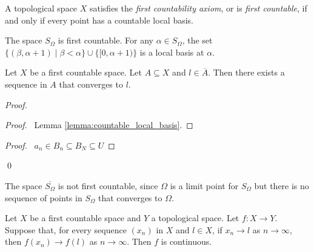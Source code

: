 \begin{definition}
    A topological space $X$ satisfies the \emph{first countability axiom}, or is \emph{first countable}, if and only if every point has a countable local basis.
\end{definition}

\begin{example}
    The space $S_\Omega$ is first countable. For any $\alpha \in S_\Omega$,
    the set $\{ (\beta, \alpha + 1) \mid \beta < \alpha \} \cup \{ [0, \alpha + 1) \}$
    is a local basis at $\alpha$.
\end{example}

\begin{lemma}
    Let $X$ be a first countable space. Let $A \subseteq X$ and $l \in \overline{A}$.
    Then there exists a sequence in $A$ that converges to $l$.
\end{lemma}

\begin{proof}
    \pf
    \begin{proof}
        \pf\ Lemma \ref{lemma:countable_local_basis}.
    \end{proof}
    \begin{proof}
        \pf\ $a_n \in B_n \subseteq B_N \subseteq U$
    \end{proof}
    \qed
\end{proof}

\begin{example}
    \label{example:S_Omega_bar_not_first_countable}
    The space $\overline{S_\Omega}$ is not first countable, since $\Omega$
    is a limit point for $S_\Omega$ but there is no sequence of points in
    $S_\Omega$ that converges to $\Omega$.
\end{example}

\begin{theorem}[CC]
    Let $X$ be a first countable space and $Y$ a topological space. Let $f : X \rightarrow Y$. Suppose that, for every sequence $(x_n)$ in $X$ and $l \in X$, if $x_n \rightarrow l$
    as $n \rightarrow \infty$, then $f(x_n) \rightarrow f(l)$ as $n \rightarrow \infty$. Then $f$ is continuous.
\end{theorem}

